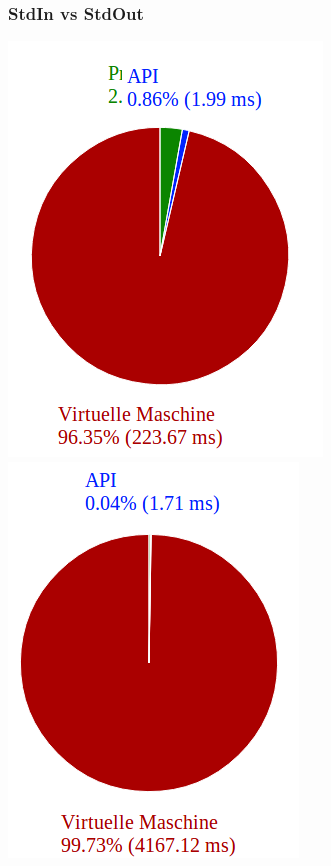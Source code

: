 \begin{frame}
\frametitle{StdIn vs StdOut}
\begin{center}
	\includegraphics[scale=0.3]{performance/100-turns.png}   	 
	\includegraphics[scale=0.3]{performance/100-looks.png}
\end{center}

\end{frame}
